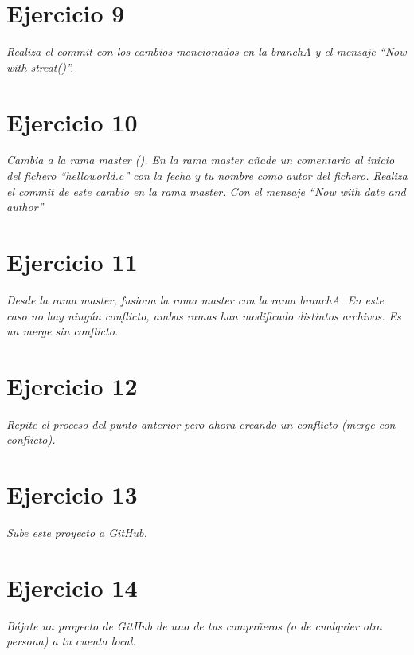 \section{Ejercicio 9}
\begin{center}
    \parbox{12cm}{\justify\textit{
        Realiza el commit con los cambios mencionados en la branchA y el mensaje ``Now with strcat()''.
    }}
\end{center}

\section{Ejercicio 10}
\begin{center}
    \parbox{12cm}{\justify\textit{
        Cambia a la rama master (). En la rama master añade un comentario al inicio del fichero ``helloworld.c'' con la fecha y tu nombre como autor del fichero. Realiza el commit de este cambio en la rama master. Con el mensaje ``Now with date and author''
    }}
\end{center}

\section{Ejercicio 11}
\begin{center}
    \parbox{12cm}{\justify\textit{
        Desde la rama master, fusiona la rama master con la rama branchA. En este caso no hay ningún conflicto, ambas ramas han modificado distintos archivos. Es un merge sin conflicto.
    }}
\end{center}

\section{Ejercicio 12}
\begin{center}
    \parbox{12cm}{\justify\textit{
        Repite el proceso del punto anterior pero ahora creando un conflicto (merge con conflicto).
    }}
\end{center}

\section{Ejercicio 13}
\begin{center}
    \parbox{12cm}{\justify\textit{
        Sube este proyecto a GitHub.
    }}
\end{center}

\section{Ejercicio 14}
\begin{center}
    \parbox{12cm}{\justify\textit{
        Bájate un proyecto de GitHub de uno de tus compañeros (o de cualquier otra  persona) a tu cuenta local.
    }}
\end{center}